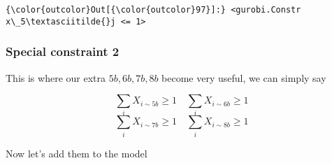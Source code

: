 \documentclass[11pt]{article}
\begin{document}
            \begin{Verbatim}[commandchars=\\\{\}]
{\color{outcolor}Out[{\color{outcolor}97}]:} <gurobi.Constr x\_5\textasciitilde{}j <= 1>
\end{Verbatim}
        
    \subsubsection{Special constraint 2}\label{special-constraint-2}

This is where our extra \(5b, 6b,7b,8b\) become very useful, we can
simply say

\[\sum_{i} X_{i\sim 5b} \geq 1 \quad \sum_{i} X_{i\sim 6b} \geq 1\]
\[\sum_{i} X_{i\sim 7b} \geq 1 \quad \sum_{i} X_{i\sim 8b} \geq 1\]

Now let's add them to the model
\end{document}
